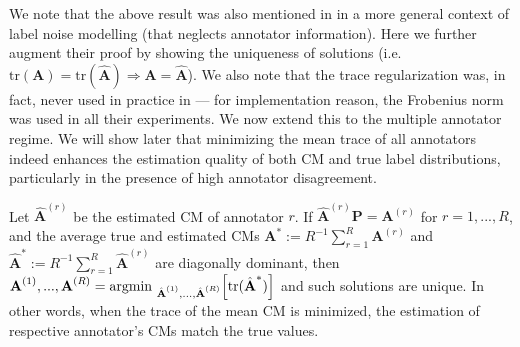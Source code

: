We note that the above result was also mentioned in \cite{sukhbaatar2014training} in a more general context of label noise modelling (that neglects annotator information). Here we further augment their proof by showing the uniqueness of solutions (i.e.  $\text{tr}(\textbf{A})= \text{tr}(\hat{\textbf{A}})	\Rightarrow \textbf{A} = \hat{\textbf{A}}$). We also note that the trace regularization was, in fact, never used in practice in \cite{sukhbaatar2014training} --- for implementation reason, the Frobenius norm was used in all their experiments.  We now extend this to the multiple annotator regime. We will show later that minimizing the mean trace of all annotators indeed enhances the estimation quality of both CM and true label distributions, particularly in the presence of high annotator disagreement. 

\begin{theorem}\label{theorem:main}
Let $\hat{\textbf{A}}^{(r)}$ be the estimated CM of annotator $r$. If $\hat{\textbf{A}}^{(r)}\textbf{P}=\textbf{A}^{(r)}$ for $r=1,...,R$, and the average true and estimated CMs $\textbf{A}^{*}:=R^{-1}\sum_{r=1}^R\textbf{A}^{(r)}$ and $\hat{\textbf{A}}^{*}:=R^{-1}\sum_{r=1}^R\hat{\textbf{A}}^{(r)}$ are diagonally dominant, then  $\textbf{A}^{(1)}, ..., \textbf{A}^{(R)} = \text{argmin }_{\hat{\textbf{A}}^{(1)}, ..., \hat{\textbf{A}}^{(R)}}\Big{[}\text{tr}(\hat{\textbf{A}}^{*})\Big{]}$ and such solutions are unique. In other words, when the trace of the mean CM is minimized, the estimation of respective annotator's CMs match the true values. 
\end{theorem}

